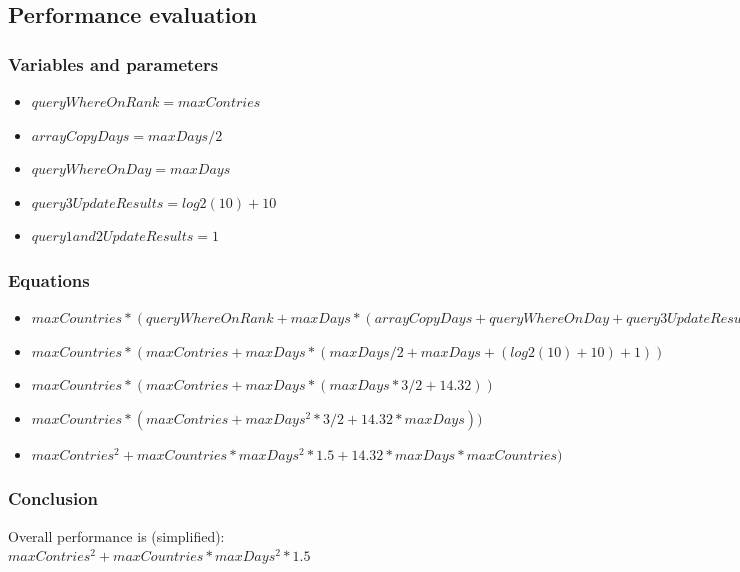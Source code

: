 \documentclass[table, 12pt]{article}
\begin{document}
\subsection{Performance evaluation}

\subsubsection{Variables and parameters}
\begin{flushleft}
\begin{itemize}
\setlength\itemsep{-0.5em}
\item $ queryWhereOnRank = maxContries $
\item $ arrayCopyDays = maxDays/2 $
\item $ queryWhereOnDay = maxDays $
\item $ query3UpdateResults = log2(10) + 10 $
\item $ query1and2UpdateResults = 1 $
\end{itemize}
\end{flushleft}

\subsubsection{Equations}
\begin{flushleft}
\begin{itemize}
\setlength\itemsep{-0.5em}
\item $ maxCountries * ( queryWhereOnRank + maxDays * (arrayCopyDays + queryWhereOnDay + query3UpdateResults + query1and2UpdateResults) )  $
\item $ maxCountries * ( maxContries + maxDays * (maxDays/2 + maxDays + (log2(10)+10) + 1) ) $
\item $ maxCountries * ( maxContries + maxDays * (maxDays* 3/2 + 14.32) ) $
\item $ maxCountries * ( maxContries + maxDays^2 * 3/2 + 14.32 * maxDays) ) $
\item $  maxContries^2 + maxCountries * maxDays^2 * 1.5 + 14.32 * maxDays * maxCountries) $
\end{itemize}
\end{flushleft}


\subsubsection{Conclusion}

Overall performance is (simplified): \\
  $  maxContries^2 + maxCountries * maxDays^2 * 1.5 $
\end{document}
